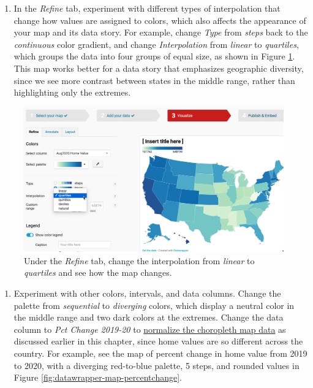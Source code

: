 \documentclass[
  english,
]{book}
\providecommand{\tightlist}{%
  \setlength{\itemsep}{0pt}\setlength{\parskip}{0pt}}
\begin{document}
\begin{enumerate}
\def\labelenumi{\arabic{enumi}.}
\setcounter{enumi}{9}
\tightlist
\item
  In the \emph{Refine} tab, experiment with different types of interpolation that change how values are assigned to colors, which also affects the appearance of your map and its data story. For example, change \emph{Type} from \emph{steps} back to the \emph{continuous} color gradient, and change \emph{Interpolation} from \emph{linear} to \emph{quartiles}, which groups the data into four groups of equal size, as shown in Figure \ref{fig:datawrapper-map-quartiles}. This map works better for a data story that emphasizes geographic diversity, since we see more contrast between states in the middle range, rather than highlighting only the extremes.
\end{enumerate}



\begin{figure}
\includegraphics[width=600px]{images/07-map/datawrapper-map-quartiles} \caption{Under the \emph{Refine} tab, change the interpolation from \emph{linear} to \emph{quartiles} and see how the map changes.}\label{fig:datawrapper-map-quartiles}
\end{figure}

\begin{enumerate}
\def\labelenumi{\arabic{enumi}.}
\setcounter{enumi}{10}
\tightlist
\item
  Experiment with other colors, intervals, and data columns. Change the palette from \emph{sequential} to \emph{diverging} colors, which display a neutral color in the middle range and two dark colors at the extremes. Change the data column to \emph{Pct Change 2019-20} to \href{normalize-choropleth.html}{normalize the choropleth map data} as discussed earlier in this chapter, since home values are so different across the country. For example, see the map of percent change in home value from 2019 to 2020, with a diverging red-to-blue palette, 5 steps, and rounded values in Figure \ref{fig:datawrapper-map-percentchange}.
\end{enumerate}
\end{document}
